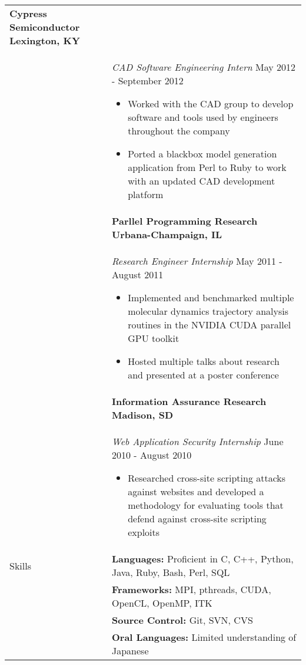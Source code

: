 \documentclass[11pt]{article}
\begin{document}
\begin{tabular}{p{1.0in} p{5.16in}}
        \textbf{Cypress Semiconductor \hfill Lexington, KY}\vspace{0.015in} \\ &
        {\textit{CAD Software Engineering Intern} \hfill May 2012 - September 2012}\vspace{0.015in}
        \begin{itemize}
            \renewcommand{\labelitemi}{$\diamond$}
            \item Worked with the CAD group to develop software and tools used by engineers throughout the company
            \item Ported a blackbox model generation application from Perl to Ruby to work with an updated CAD development platform
        \end{itemize} \\ &

        \textbf{Parllel Programming Research \hfill Urbana-Champaign, IL}\vspace{0.015in} \\ &
        \textit{Research Engineer Internship} \hfill May 2011 - August 2011 \vspace{0.0175in}
        \begin{itemize}
            \renewcommand{\labelitemi}{$\diamond$}
            \item Implemented and benchmarked multiple molecular dynamics trajectory analysis routines in the NVIDIA CUDA parallel GPU toolkit 
            \item Hosted multiple talks about research and presented at a poster conference
        \end{itemize} \\ &

        \textbf{Information Assurance Research \hfill Madison, SD}\vspace{0.015in} \\ &
        {\textit{Web Application Security Internship} \hfill June 2010 - August 2010}\vspace{0.015in}
        \begin{itemize}
            \renewcommand{\labelitemi}{$\diamond$}            
            \item Researched cross-site scripting attacks against websites and developed a methodology for evaluating tools that defend against cross-site scripting exploits
        \end{itemize} \\
        

    {Skills} &
        \textbf{Languages:} Proficient in C, C++, Python, Java, Ruby, Bash, Perl, SQL \\ &
        \textbf{Frameworks:} MPI, pthreads, CUDA, OpenCL, OpenMP, ITK \\ &
        \textbf{Source Control:} Git, SVN, CVS \\ &
        \textbf{Oral Languages:} Limited understanding of Japanese \\
\end{tabular}
\end{document}
